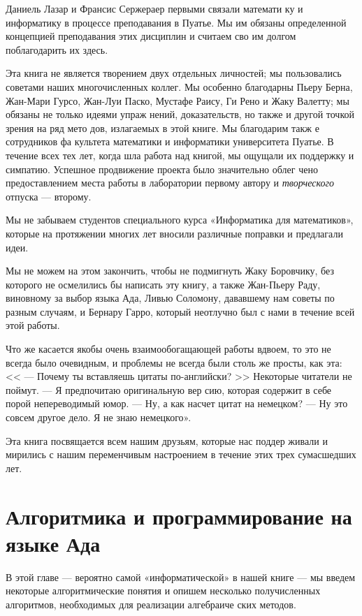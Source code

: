 	Даниель  Лазар  и  Франсис  Сержераер  первыми  связали математи­
	ку и информатику в процессе преподавания в Пуатье. Мы им обязаны 
	определенной концепцией преподавания этих дисциплин и считаем сво­
	им долгом поблагодарить их здесь.	
	
	Эта книга не является творением двух отдельных личностей; мы 
	пользовались советами  наших  многочисленных  коллег.  Мы  особенно 
	благодарны Пьеру Берна, Жан-Мари Гурсо, Жан-Луи Паско, Мустафе 
	Раису, Ги Рено и Жаку Валетту; мы обязаны не только идеями упраж­
	нений, доказательств, но также и другой точкой зрения на ряд мето­
	дов,  излагаемых  в этой  книге.  Мы  благодарим такж е сотрудников фа­
	культета математики  и  информатики университета Пуатье.  В течение 
	всех тех лет,  когда шла работа над  книгой, мы ощущали их поддержку 
	и  симпатию.  Успешное  продвижение  проекта  было значительно облег­
	чено  предоставлением  места  работы  в  лаборатории  первому  автору и 
	\textit{творческого} отпуска —  второму.
	
	Мы  не  забываем  студентов  специального  курса  «Информатика для 
	математиков»,  которые  на протяжении  многих лет  вносили  различные 
	поправки  и  предлагали  идеи.
	
	Мы  не  можем  на  этом закончить,  чтобы  не  подмигнуть Жаку Боровчику,
	без  которого  не  осмелились  бы  написать  эту  книгу,  а также 
	Жан-Пьеру  Раду,  виновному  за   выбор  языка  Ада,  Ливью  Соломону, 
	дававшему  нам  советы  по  разным  случаям,  и  Бернару  Гарро,  который 
	неотлучно  был  с  нами  в течение  всей  этой  работы.
	
	Что же  касается  якобы очень  взаимообогащающей  работы  вдвоем, 
	то это не всегда было очевидным, и проблемы не всегда были столь 
	же просты, как эта: << — Почему ты  вставляешь цитаты  по-английски? >>
	Некоторые  читатели  не  поймут.  — Я  предпочитаю  оригинальную  вер­
	сию, которая содержит в себе порой непереводимый  юмор. — Ну, а как 
	насчет цитат на немецком?  —  Ну это совсем другое дело. Я не знаю 
	немецкого».
	
	Эта  книга посвящается всем нашим друзьям, которые нас поддер­
	живали и мирились с нашим переменчивым настроением в течение этих 
	трех сумасшедших лет.
	\chapter{Алгоритмика и \newline программирование на \newline языке Ада}
	\noindent В этой главе — вероятно самой «информатической» в нашей книге —
	мы введем некоторые алгоритмические понятия и опишем несколько
	получисленных алгоритмов, необходимых для реализации алгебраиче­
	ских методов.
	
